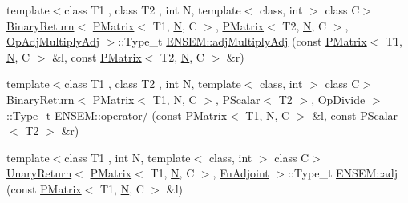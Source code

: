 \begin{DoxyCompactItemize}
{\footnotesize template$<$class T1 , class T2 , int N, template$<$ class, int $>$ class C$>$ }\\\mbox{\hyperlink{structENSEM_1_1BinaryReturn}{Binary\+Return}}$<$ \mbox{\hyperlink{classENSEM_1_1PMatrix}{P\+Matrix}}$<$ T1, \mbox{\hyperlink{adat__devel_2lib_2hadron_2operator__name__util_8cc_a7722c8ecbb62d99aee7ce68b1752f337}{N}}, C $>$, \mbox{\hyperlink{classENSEM_1_1PMatrix}{P\+Matrix}}$<$ T2, \mbox{\hyperlink{adat__devel_2lib_2hadron_2operator__name__util_8cc_a7722c8ecbb62d99aee7ce68b1752f337}{N}}, C $>$, \mbox{\hyperlink{structENSEM_1_1OpAdjMultiplyAdj}{Op\+Adj\+Multiply\+Adj}} $>$\+::Type\+\_\+t \mbox{\hyperlink{group__primmatrix_ga81c788e54ea0f4c4de97e7bfa9d7cd89}{E\+N\+S\+E\+M\+::adj\+Multiply\+Adj}} (const \mbox{\hyperlink{classENSEM_1_1PMatrix}{P\+Matrix}}$<$ T1, \mbox{\hyperlink{adat__devel_2lib_2hadron_2operator__name__util_8cc_a7722c8ecbb62d99aee7ce68b1752f337}{N}}, C $>$ \&l, const \mbox{\hyperlink{classENSEM_1_1PMatrix}{P\+Matrix}}$<$ T2, \mbox{\hyperlink{adat__devel_2lib_2hadron_2operator__name__util_8cc_a7722c8ecbb62d99aee7ce68b1752f337}{N}}, C $>$ \&r)
\item 
{\footnotesize template$<$class T1 , class T2 , int N, template$<$ class, int $>$ class C$>$ }\\\mbox{\hyperlink{structENSEM_1_1BinaryReturn}{Binary\+Return}}$<$ \mbox{\hyperlink{classENSEM_1_1PMatrix}{P\+Matrix}}$<$ T1, \mbox{\hyperlink{adat__devel_2lib_2hadron_2operator__name__util_8cc_a7722c8ecbb62d99aee7ce68b1752f337}{N}}, C $>$, \mbox{\hyperlink{classENSEM_1_1PScalar}{P\+Scalar}}$<$ T2 $>$, \mbox{\hyperlink{structENSEM_1_1OpDivide}{Op\+Divide}} $>$\+::Type\+\_\+t \mbox{\hyperlink{group__primmatrix_ga1b00e76a765453dfbb33f0630bd863c3}{E\+N\+S\+E\+M\+::operator/}} (const \mbox{\hyperlink{classENSEM_1_1PMatrix}{P\+Matrix}}$<$ T1, \mbox{\hyperlink{adat__devel_2lib_2hadron_2operator__name__util_8cc_a7722c8ecbb62d99aee7ce68b1752f337}{N}}, C $>$ \&l, const \mbox{\hyperlink{classENSEM_1_1PScalar}{P\+Scalar}}$<$ T2 $>$ \&r)
\item 
{\footnotesize template$<$class T1 , int N, template$<$ class, int $>$ class C$>$ }\\\mbox{\hyperlink{structENSEM_1_1UnaryReturn}{Unary\+Return}}$<$ \mbox{\hyperlink{classENSEM_1_1PMatrix}{P\+Matrix}}$<$ T1, \mbox{\hyperlink{adat__devel_2lib_2hadron_2operator__name__util_8cc_a7722c8ecbb62d99aee7ce68b1752f337}{N}}, C $>$, \mbox{\hyperlink{structENSEM_1_1FnAdjoint}{Fn\+Adjoint}} $>$\+::Type\+\_\+t \mbox{\hyperlink{group__primmatrix_ga443bf356f8bca93ff78f16db721417b9}{E\+N\+S\+E\+M\+::adj}} (const \mbox{\hyperlink{classENSEM_1_1PMatrix}{P\+Matrix}}$<$ T1, \mbox{\hyperlink{adat__devel_2lib_2hadron_2operator__name__util_8cc_a7722c8ecbb62d99aee7ce68b1752f337}{N}}, C $>$ \&l)

\end{DoxyCompactItemize}
